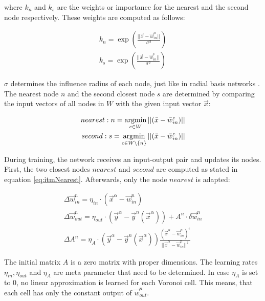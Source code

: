 where $k_n$ and $k_s$ are the weights or importance for the nearest and the second node respectively. These weights are computed as follows:

\begin{equation}
\begin{split}
k_n = \exp\left(\frac{||\vec{x}-\vec{w}^n_{in}||}{\sigma^2}\right) \\
k_s = \exp\left(\frac{||\vec{x}-\vec{w}^s_{in}||}{\sigma^2}\right) 
\end{split}
\end{equation}

$\sigma$ determines the influence radius of each node, just like in radial basis networks \cite{rbf}. The nearest node $n$ and the second closest node $s$ are determined by comparing the input vectors of all nodes in $W$ with the given input vector $\vec{x}$:

\begin{equation}
\begin{split}
	nearest: n = \argmin_{c\in W} ||(\vec{x} - \vec{w}^c_{in})|| \\
	second: s = \argmin_{c\in W\backslash\{n\}} ||(\vec{x} - \vec{w}^c_{in})||
\end{split}
\label{eq:itmNearest}
\end{equation}

During training, the network receives an input-output pair and updates its nodes. First, the two closest nodes $nearest$ and $second$ are computed as stated in equation \ref{eq:itmNearest}. Afterwards, only the node $nearest$ is adapted:

\begin{equation}
\begin{split}
\Delta \vec{w}^n_{in} = \eta_{in} \cdot (\vec{x}^\alpha - \vec{w}^n_{in}) \\
\Delta \vec{w}^n_{out} = \eta_{out} \cdot (\vec{y}^\alpha - \vec{y}^n(\vec{x}^\alpha)) + A^n \cdot \delta \vec{w}^n_{in} \\
\Delta A^n = \eta_A \cdot (\vec{y}^\alpha - \vec{y}^n(\vec{x}^\alpha)) \frac{(\vec{x}^\alpha - \vec{w}^n_{in})^t}{||\vec{x}^\alpha - \vec{w}^n_{in}||^2}
\end{split}
\end{equation}

The initial matrix $A$ is a zero matrix with proper dimensions. The learning rates $\eta_{in}, \eta_{out}$ and $\eta_A$ are meta parameter that need to be determined. In case $\eta_A$ is set to 0, no linear approximation is learned for each Voronoi cell. This means, that each cell has only the constant output of $\vec{w}^n_{out}$.

